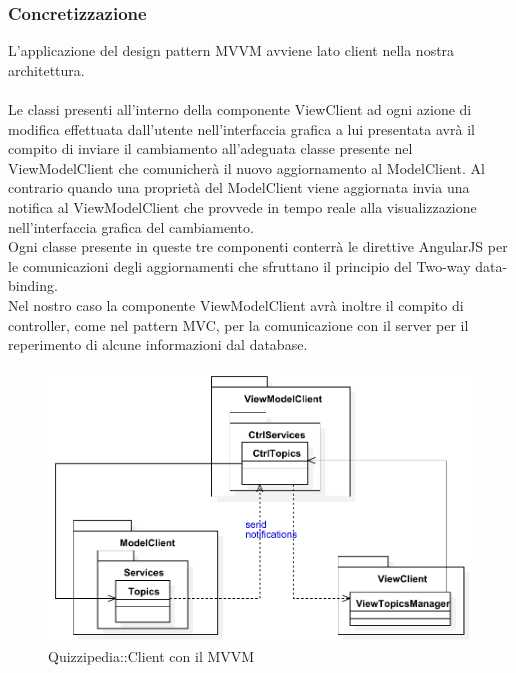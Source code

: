 \documentclass[a4paper, titlepage]{article}
\begin{document}
\subsubsection{Concretizzazione}
L'applicazione del design pattern MVVM avviene lato client nella nostra architettura.
\\
\\ Le classi presenti all'interno della componente ViewClient ad ogni azione di modifica effettuata dall'utente nell'interfaccia grafica a lui presentata avrà il compito di inviare il cambiamento all'adeguata classe presente nel ViewModelClient che comunicherà il nuovo aggiornamento al ModelClient. Al contrario quando una proprietà del ModelClient viene aggiornata invia una notifica al ViewModelClient che provvede in tempo reale alla visualizzazione nell'interfaccia grafica del cambiamento.
\\ Ogni classe presente in queste tre componenti conterrà le direttive AngularJS per le comunicazioni degli aggiornamenti che sfruttano il principio del Two-way data-binding.
\\ Nel nostro caso la componente ViewModelClient avrà inoltre il compito di controller, come nel pattern MVC, per la comunicazione con il server per il reperimento di alcune informazioni dal database.
\begin{figure}[htp]
\centering
\includegraphics[scale=0.75]{Img/MVVM.pdf}
\caption{Quizzipedia::Client con il MVVM}
\label{}
\end{figure}
\end{document}

